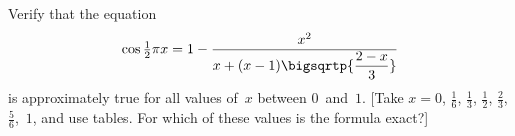 Verify that the equation
\[
\cos\tfrac{1}{2}\pi x
  = 1 - \frac{x^{2}}{x + (x - 1)\bigsqrtp{\dfrac{2 - x}{3}}}
\]
is approximately true for all values of~$x$ between $0$~and~$1$. [Take $x = 0$, $\frac{1}{6}$, $\frac{1}{3}$,
$\tfrac{1}{2}$, $\frac{2}{3}$, $\frac{5}{6}$,~$1$, and use tables. For which of these values is the formula exact?]


